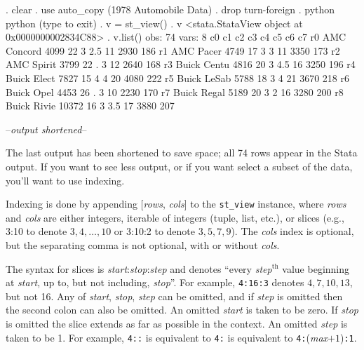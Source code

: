 \documentclass{article}
\begin{document}
\begin{stlog}
. clear
{\smallskip}
. use auto_copy
(1978 Automobile Data)
{\smallskip}
. drop turn-foreign
{\smallskip}
. python
 python (type {} to exit) 
{\bftt{>>>}}. v = st_view()
{\smallskip}
{\bftt{>>>}}. v
<stata.StataView object at 0x0000000002834C88>
{\smallskip}
{\bftt{>>>}}. v.list()
{\smallskip}
  obs: 74
 vars:  8
{\smallskip}
             c0       c1       c2       c3       c4       c5       c6       c7
 r0 AMC Concord     4099       22        3      2.5       11     2930      186
 r1   AMC Pacer     4749       17        3        3       11     3350      173
 r2  AMC Spirit     3799       22        .        3       12     2640      168
 r3 Buick Centu     4816       20        3      4.5       16     3250      196
 r4 Buick Elect     7827       15        4        4       20     4080      222
 r5 Buick LeSab     5788       18        3        4       21     3670      218
 r6  Buick Opel     4453       26        .        3       10     2230      170
 r7 Buick Regal     5189       20        3        2       16     3280      200
 r8 Buick Rivie    10372       16        3      3.5       17     3880      207

--\textit{output shortened}--
\end{stlog}

\medskip

The last output has been shortened to save space; all 74 rows appear in the Stata output. If you want to see less output, or if you want select a subset of the data, you'll want to use indexing.

Indexing is done by appending [\textit{rows}, \textit{cols}] to the \lstinline{st_view} instance, where \textit{rows} and \textit{cols} are either integers, iterable of integers (tuple, list, etc.), or slices (e.g., 3:10 to denote $3, 4, \ldots, 10$ or 3:10:2 to denote $3, 5, 7, 9$). The \textit{cols} index is optional, but the separating comma is not optional, with or without \textit{cols}. 

The syntax for slices is \textit{start}:\textit{stop}:\textit{step} and denotes ``every \textit{step}$^{\text{th}}$ value beginning at \textit{start}, up to, but not including, \textit{stop}''. For example, \lstinline{4:16:3} denotes $4, 7, 10, 13$, but not 16. Any of \textit{start}, \textit{stop}, \textit{step} can be omitted, and if \textit{step} is omitted then the second colon can also be omitted. An omitted \textit{start} is taken to be zero. If \textit{stop} is omitted the slice extends as far as possible in the context. An omitted \textit{step} is taken to be 1. For example,
\lstinline{4::} is equivalent to \lstinline{4:} is equivalent to \lstinline{4:}(\textit{max}$ + 1$)\lstinline{:1}.
\end{document}
